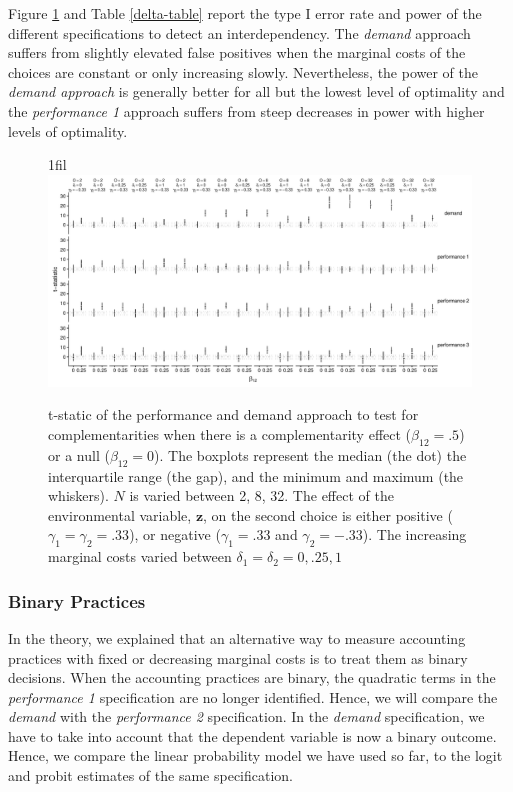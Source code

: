 \documentclass[12pt]{article}
\makeatletter
\newcommand*{\centerfloat}{%
  \parindent \z@
  \leftskip \z@ \@plus 1fil \@minus \textwidth
  \rightskip\leftskip
  \parfillskip \z@skip}
\makeatother
\begin{document}
Figure \ref{delta} and Table \ref{delta-table} report the type I error rate and power of the different specifications to detect an interdependency. The \emph{demand} approach suffers from slightly elevated false positives when the marginal costs of the choices are constant or only increasing slowly. Nevertheless, the power of the \emph{demand approach} is generally better for all but the lowest level of optimality and the \emph{performance 1} approach suffers from steep decreases in power with higher levels of optimality.

\begin{figure}
\centerfloat
\includegraphics[width=600px]{figure-latex/delta_plot.pdf}
\caption[The Error Rate and Power with Different Levels of Marginal Costs]
{\label{delta} t-static of the performance and demand approach to test
for complementarities when there is a complementarity effect ($\beta_{12} = .5$)
or a null ($\beta_{12} = 0$). The boxplots represent the median (the dot) the
interquartile range (the gap), and the minimum and maximum (the whiskers). $N$
is varied between 2, 8, 32. The effect of the environmental
variable, $\mathbf{z}$, on the second choice is either positive
($\gamma_1 = \gamma_2 = .33$), or negative ($\gamma_1 = .33$ and $\gamma_2 = -.33$).
The increasing marginal costs varied between $\delta_1 = \delta_2 = 0, .25, 1$}
\end{figure}



\subsubsection{Binary Practices}

In the theory, we explained that an alternative way to measure accounting practices with fixed or decreasing marginal costs is to treat them as binary decisions. When the accounting practices are binary, the quadratic terms in the \emph{performance 1} specification are no longer identified. Hence, we will compare the \emph{demand} with the \emph{performance 2} specification. In the \emph{demand} specification, we have to take into account that the dependent variable is now a binary outcome. Hence, we compare the linear probability model we have used so far, to the logit and probit estimates of the same specification.  
\end{document}
